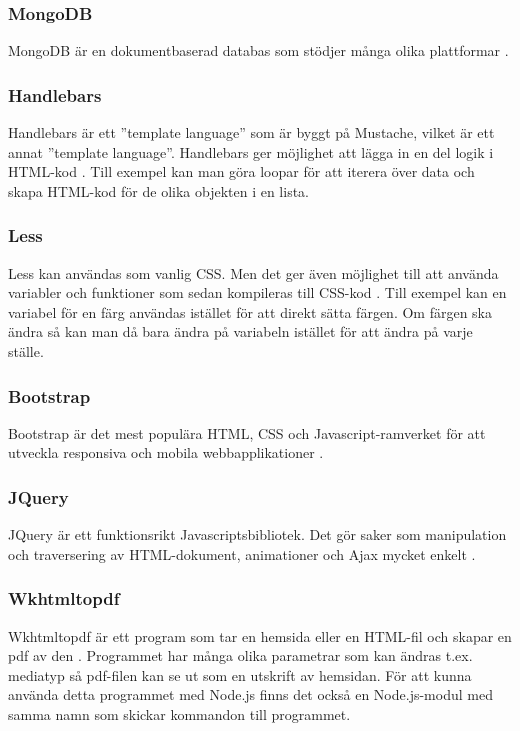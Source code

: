 \documentclass{article}
\begin{document}
\subsubsection{MongoDB}
MongoDB är en dokumentbaserad databas som stödjer många olika plattformar \cite{mongodb}.

\subsubsection{Handlebars}
Handlebars är ett ''template language'' som är byggt på Mustache, vilket är ett annat ''template language''. Handlebars ger möjlighet att lägga in en del logik i HTML-kod \cite{handlebars}. Till exempel kan man göra loopar för att iterera över data och skapa HTML-kod för de olika objekten i en lista.  

\subsubsection{Less}
Less kan användas som vanlig CSS. Men det ger även möjlighet till att använda variabler och funktioner som sedan kompileras till CSS-kod \cite{less}. Till exempel kan en variabel för en färg användas istället för att direkt sätta färgen. Om färgen ska ändra så kan man då bara ändra på variabeln istället för att ändra på varje ställe.

\subsubsection{Bootstrap}
Bootstrap är det mest populära HTML, CSS och Javascript-ramverket för att utveckla responsiva och mobila webbapplikationer \cite{bootstrap}. 

\subsubsection{JQuery}
JQuery är ett funktionsrikt Javascriptsbibliotek. Det gör saker som manipulation och traversering av HTML-dokument, animationer och Ajax mycket enkelt \cite{jquery}.

\subsubsection{Wkhtmltopdf}
Wkhtmltopdf är ett program som tar en hemsida eller en HTML-fil och skapar en pdf av den \cite{wkhtmltopdf}. Programmet har många olika parametrar som kan ändras t.ex. mediatyp så pdf-filen kan se ut som en utskrift av hemsidan. För att kunna använda detta programmet med Node.js finns det också en Node.js-modul med samma namn som skickar kommandon till programmet.
\end{document}
